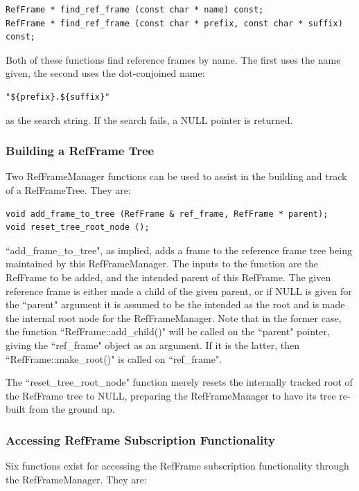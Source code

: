 \begin{verbatim}
RefFrame * find_ref_frame (const char * name) const;
RefFrame * find_ref_frame (const char * prefix, const char * suffix) const;
\end{verbatim}

Both of these functions find reference frames by name. The first
uses the name given, the second uses the dot-conjoined name:

\begin{verbatim}
"${prefix}.${suffix}"
\end{verbatim}

as the search string. If the search fails, a NULL pointer
is returned.

\subsubsection{Building a RefFrame Tree}

Two RefFrameManager functions can be used to assist in
the building and track of a RefFrameTree. They are:

\begin{verbatim}
void add_frame_to_tree (RefFrame & ref_frame, RefFrame * parent);
void reset_tree_root_node ();
\end{verbatim}

``add\_frame\_to\_tree", as implied, adds a frame to the reference
frame tree being maintained by this RefFrameManager. The inputs to
the function are the RefFrame to be added, and the intended parent
of this RefFrame. The given reference frame is either made
a child of the given parent, or if NULL is given
for the ``parent" argument it is assumed to be the
intended as the root and is made the internal
root node for the RefFrameManager. Note that in the former case,
the function ``RefFrame::add\_child()" will be called on the ``parent"
pointer, giving the ``ref\_frame" object as an argument. If
it is the latter, then ``RefFrame::make\_root()" is called on
``ref\_frame".

The ``reset\_tree\_root\_node" function merely resets the internally
tracked root of the RefFrame tree to NULL, preparing the RefFrameManager
to have its tree re-built from the ground up.

\subsubsection{Accessing RefFrame Subscription Functionality}

Six functions exist for accessing the RefFrame subscription
functionality through the RefFrameManager. They are:

